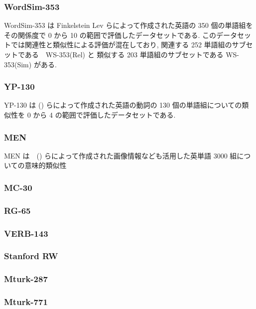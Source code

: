 \documentclass[twocolumn]{jarticle}     %
\begin{document}
\subsubsection{WordSim-353}
WordSim-353\cite{wordsim353} は Finkelstein Lev らによって作成された英語の 350 個の単語組をその関係度で 0 から 10 の範囲で評価したデータセットである.
このデータセットでは関連性と類似性による評価が混在しており, 関連する 252 単語組のサブセットである　WS-353(Rel) と 類似する 203 単語組のサブセットである WS-353(Sim) がある.

\subsubsection{YP-130}
YP-130 は () らによって作成された英語の動詞の 130 個の単語組についての類似性を 0 から 4 の範囲で評価したデータセットである. 

\subsubsection{MEN}
MEN は　() らによって作成された画像情報なども活用した英単語 3000 組についての意味的類似性

\subsubsection{MC-30}

\subsubsection{RG-65}

\subsubsection{VERB-143}

\subsubsection{Stanford RW}

\subsubsection{Mturk-287}

\subsubsection{Mturk-771}
\end{document}
